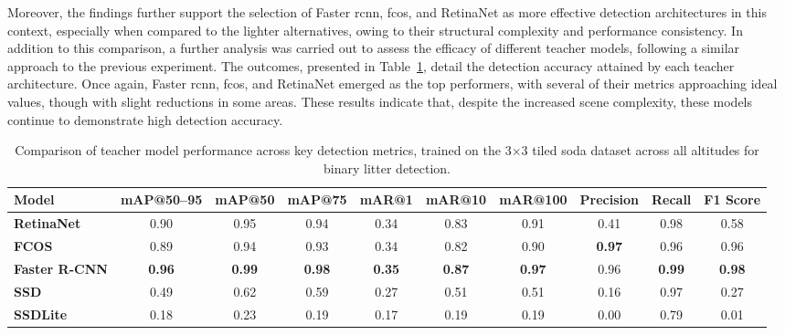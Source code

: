 Moreover, the findings further support the selection of Faster \gls{rcnn}, \gls{fcos}, and RetinaNet as more effective detection architectures in this context, especially when compared to the lighter alternatives, owing to their structural complexity and performance consistency.
In addition to this comparison, a further analysis was carried out to assess the efficacy of different teacher models, following a similar approach to the previous experiment. The outcomes, presented in Table~\ref{tab:teacher_model_metrics_soda_tiled_single}, detail the detection accuracy attained by each teacher architecture. Once again, Faster \gls{rcnn}, \gls{fcos}, and RetinaNet emerged as the top performers, with several of their metrics approaching ideal values, though with slight reductions in some areas. These results indicate that, despite the increased scene complexity, these models continue to demonstrate high detection accuracy.

\begin{table}[!ht]
    \centering
    \begin{adjustbox}{max width=\textwidth}
    \renewcommand{\arraystretch}{1.5}
    \begin{tabular}{|l|c|c|c|c|c|c|c|c|c|}
        \hline
        \textbf{Model} & \textbf{mAP@50--95} & \textbf{mAP@50} & \textbf{mAP@75} & \textbf{mAR@1} & \textbf{mAR@10} & \textbf{mAR@100} & \textbf{Precision} & \textbf{Recall} & \textbf{F1 Score} \\ \hline \hline
        \textbf{RetinaNet} & 0.90 & 0.95 & 0.94 & 0.34 & 0.83 & 0.91 & 0.41 & 0.98 & 0.58 \\\hline
        \textbf{FCOS} & 0.89 & 0.94 & 0.93 & 0.34 & 0.82 & 0.90 & \textbf{0.97} & 0.96 & 0.96 \\\hline
        \textbf{Faster R-CNN} & \textbf{0.96} & \textbf{0.99} & \textbf{0.98} & \textbf{0.35} & \textbf{0.87} & \textbf{0.97} & 0.96 & \textbf{0.99} & \textbf{0.98} \\\hline
        \textbf{SSD} & 0.49 & 0.62 & 0.59 & 0.27 & 0.51 & 0.51 & 0.16 & 0.97 & 0.27 \\\hline
        \textbf{SSDLite} & 0.18 & 0.23 & 0.19 & 0.17 & 0.19 & 0.19 & 0.00 & 0.79 & 0.01 \\
        \hline
    \end{tabular}
    \renewcommand{\arraystretch}{1}
    \end{adjustbox}
    \caption{Comparison of teacher model performance across key detection metrics, trained on the 3$\times$3 tiled \gls{soda} dataset across all altitudes for binary litter detection.}
    \label{tab:teacher_model_metrics_soda_tiled_single}
\end{table}

